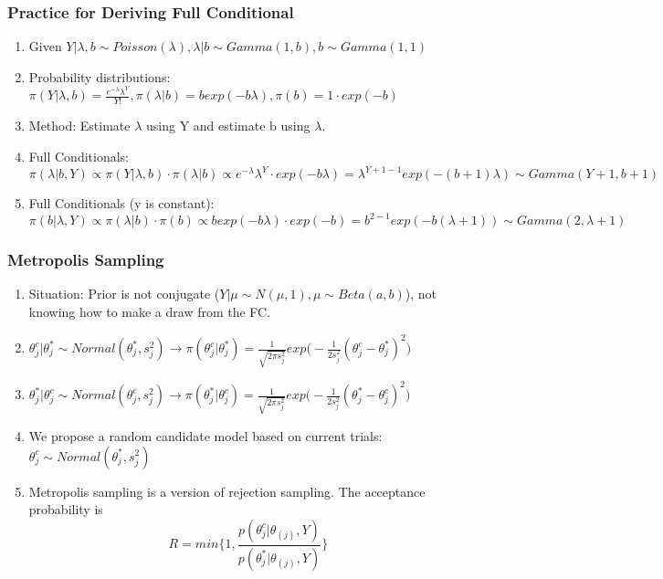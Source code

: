 \documentclass{beamer}
\begin{document}
\begin{frame}
\frametitle{Practice for Deriving Full Conditional}

\begin{enumerate}
\item Given $Y|\lambda,b \sim Poisson(\lambda), \lambda|b \sim Gamma(1,b), b\sim Gamma(1,1)$

\item Probability distributions: $\pi(Y|\lambda,b) = \frac{e^{-\lambda}\lambda^Y}{Y!}, \pi(\lambda|b) = b exp(-b\lambda), \pi(b) = 1 \cdot exp(-b)$

\item Method: Estimate $\lambda$ using Y and estimate b using $\lambda$.

\item Full Conditionals: $\pi(\lambda|b,Y) \propto \pi(Y|\lambda,b) \cdot \pi(\lambda|b) \propto  e^{-\lambda}\lambda^Y \cdot exp(-b\lambda) = \lambda^{Y+1-1} exp(-(b+1)\lambda) \sim Gamma(Y+1,b+1)$

\item Full Conditionals (y is constant): $\pi(b|\lambda,Y) \propto \pi(\lambda|b) \cdot \pi(b) \propto b exp(-b\lambda) \cdot exp(-b) = b^{2-1} exp(-b(\lambda+1)) \sim Gamma(2,\lambda+1)$


\end{enumerate}

\end{frame}


\begin{frame}
\frametitle{Metropolis Sampling}

\begin{enumerate}
\item Situation: Prior is not conjugate ($Y|\mu \sim N(\mu,1), \mu \sim Beta(a,b)$), not knowing how to make a draw from the FC.
\item $\theta_j^c|\theta_j^* \sim Normal(\theta_j^*,s_j^2) \rightarrow \pi(\theta_j^c|\theta_j^*) = \frac{1}{\sqrt{2\pi s_j^2}} exp\Big(-\frac{1}{2 s_j^2} (\theta_j^c - \theta_j^*)^2\Big)$
\item $\theta_j^*|\theta_j^c \sim Normal(\theta_j^c,s_j^2) \rightarrow \pi(\theta_j^*|\theta_j^c) = \frac{1}{\sqrt{2\pi s_j^2}} exp\Big(-\frac{1}{2 s_j^2} (\theta_j^* - \theta_j^c)^2\Big)$

\item We propose a random candidate model based on current trials: $\theta_j^c \sim Normal(\theta_j^*, s_j^2)$

\item Metropolis sampling is a version of rejection sampling. The acceptance probability is 
$$R = min \Big\{1, \frac{p(\theta_j^c|\theta_{(j)},Y)}{p(\theta_j^*|\theta_{(j)},Y)} \Big\}$$ 


\end{enumerate}

\end{frame}
\end{document}

